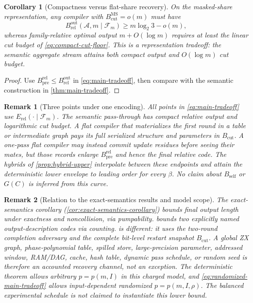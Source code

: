 \documentclass[aps,prx,reprint,floatfix,superscriptaddress]{revtex4-2}
\newtheorem{corollary}{Corollary}
\newtheorem{remark}{Remark}
\begin{document}
\begin{corollary}[Compactness versus flat-share recovery]
\label{cor:output-inflation}
On the masked-share representation, any compiler with
$B_{\mathrm{cut}}^{\mathrm{MS}}=o(m)$ must have
\begin{equation*}
 B_{\mathrm{rel}}^{\mathrm{out}}(\mathcal A,m\mid\mathcal F_m)
 \geq m\log_2 3-o(m),
\end{equation*}
whereas family-relative optimal output $m+O(\log m)$ requires at least the linear
cut budget of \eqref{eq:compact-cut-floor}.  This is a representation
tradeoff: the semantic aggregate stream attains both compact output and
$O(\log m)$ cut budget.
\end{corollary}

\begin{proof}
Use $B_{\mathrm{pre}}^{\mathrm{rel}}\leq
B_{\mathrm{rel}}^{\mathrm{out}}$ in \eqref{eq:main-tradeoff}, then compare
with the semantic construction in \cref{thm:main-tradeoff}.
\end{proof}

\begin{remark}[Three points under one encoding]
\label{rem:corners}
All points in \eqref{eq:main-tradeoff} use
$E_{\mathrm{rel}}(\cdot\mid\mathcal F_m)$.  The semantic pass-through has
compact relative output and logarithmic cut budget.  A flat compiler that
materializes the first round in a table or intermediate graph pays its
full serialized structure and parameters in $B_{\mathrm{cut}}$.  A
one-pass flat compiler may instead commit update residues before seeing
their mates, but those records enlarge $B_{\mathrm{pre}}^{\mathrm{rel}}$
and hence the final relative code.  The hybrids of
\cref{prop:hybrid-upper} interpolate between these endpoints and attain the
deterministic lower envelope to leading order for every $\beta$.  No claim
about $B_{\mathrm{self}}$ or $G(C)$ is inferred from this curve.
\end{remark}

\begin{remark}[Relation to the exact-semantics results and model scope]
\label{rem:three-channels}
The exact-semantics corollary
(\cref{cor:exact-semantics-corollary}) bounds final output length under
exactness and noncollision, via pumpability.  
bounds two explicitly named output-description codes via counting.
 is different: it uses the two-round completion
adversary and the complete bit-level restart snapshot
$B_{\mathrm{cut}}$.  A global ZX graph, phase-polynomial table, spilled
store, large-precision parameter, addressed window, RAM/DAG, cache, hash
table, dynamic pass schedule, or random seed is therefore an accounted
recovery channel, not an exception.  The deterministic theorem allows
arbitrary $p=p(m,I)$ in this charged model, and
\eqref{eq:randomized-main-tradeoff} allows input-dependent randomized
$p=p(m,I,\rho)$.  The balanced experimental schedule is not claimed to
instantiate this lower bound.
\end{remark}
\end{document}
